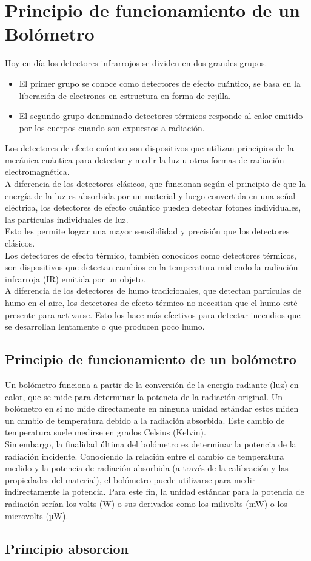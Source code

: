 \documentclass[a4paper,journal]{IEEEtran}
\begin{document}
\section{Principio de funcionamiento de un Bolómetro}
Hoy en día los detectores infrarrojos se dividen en dos grandes grupos.
\begin{itemize}
  \item El primer grupo se conoce como detectores de efecto cuántico, se basa en la liberación de electrones en estructura en forma de rejilla. 
  \item El segundo grupo denominado detectores térmicos responde al calor emitido por los cuerpos cuando son expuestos a radiación. 
\end{itemize}
Los detectores de efecto cuántico son dispositivos que utilizan principios de la mecánica cuántica para detectar y medir la luz u otras formas de radiación electromagnética. \\
A diferencia de los detectores clásicos, que funcionan según el principio de que la energía de la luz es absorbida por un material y luego convertida en una señal eléctrica, los detectores de efecto cuántico pueden detectar fotones individuales, las partículas individuales de luz. 
\\Esto les permite lograr una mayor sensibilidad y precisión que los detectores clásicos.
\\
Los detectores de efecto térmico, también conocidos como detectores térmicos, son dispositivos que detectan cambios en la temperatura midiendo la radiación infrarroja (IR) emitida por un objeto. 
\\A diferencia de los detectores de humo tradicionales, que detectan partículas de humo en el aire, los detectores de efecto térmico no necesitan que el humo esté presente para activarse. Esto los hace más efectivos para detectar incendios que se desarrollan lentamente o que producen poco humo.

\subsection[Principio de funcionamiento de un bolómetro]{Principio de funcionamiento de un bolómetro}
Un bolómetro funciona a partir de la conversión de la energía radiante (luz) en calor, que se mide para determinar la potencia de la radiación original.
Un bolómetro en sí no mide directamente en ninguna unidad estándar estos miden un cambio de temperatura debido a la radiación absorbida. Este cambio de temperatura suele medirse en grados Celsius (Kelvin).\\
Sin embargo, la finalidad última del bolómetro es determinar la potencia de la radiación incidente. Conociendo la relación entre el cambio de temperatura medido y la potencia de radiación absorbida (a través de la calibración y las propiedades del material), el bolómetro puede utilizarse para medir indirectamente la potencia. Para este fin, la unidad estándar para la potencia de radiación serían los volts (W) o sus derivados como los milivolts (mW) o los microvolts (µW).\\
\subsection*{Principio absorcion}
\end{document}
